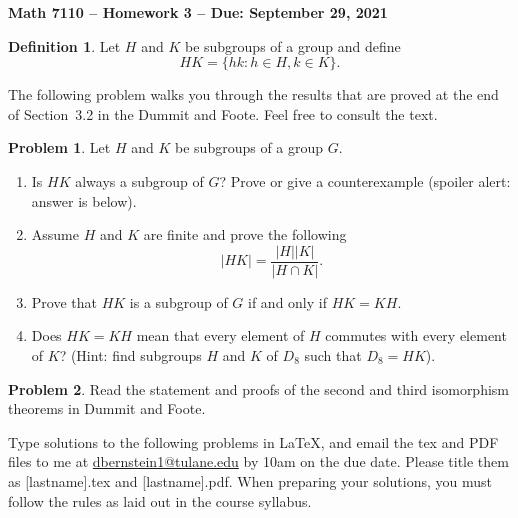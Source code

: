 \documentclass[letterpaper,11pt]{amsart}
\theoremstyle{plain}
\theoremstyle{definition}
\newtheorem*{defn*}{Definition}
\newtheorem{pr}{Problem}
\theoremstyle{remark}
\begin{document}
\Large

\begin{center}
{\bf Math 7110 -- Homework  3 --  Due:  September 29, 2021}
\end{center}

\normalsize


\medskip


\begin{defn*}
    Let $H$ and $K$ be subgroups of a group and define
    \[
        HK = \{hk: h \in H, k \in K\}.
    \]
\end{defn*}

The following problem walks you through the results that are proved at the end of Section~3.2 in the Dummit and Foote. Feel free to consult the text.

\begin{pr}
    Let $H$ and $K$ be subgroups of a group $G$.
    \begin{enumerate}
        \item Is $HK$ always a subgroup of $G$? Prove or give a counterexample (spoiler alert: answer is below).
        \item Assume $H$ and $K$ are finite and prove the following
        \[
            |HK| = \frac{|H||K|}{|H\cap K|}.
        \]
        \item Prove that $HK$ is a subgroup of $G$ if and only if $HK = KH$.
        \item Does $HK = KH$ mean that every element of $H$ commutes with every element of $K$? (Hint: find subgroups $H$ and $K$ of $D_8$ such that $D_8 = HK$).
    \end{enumerate}
\end{pr}

\begin{pr}
     Read the statement and proofs of the second and third isomorphism theorems in Dummit and Foote.
\end{pr}

\bigskip

Type solutions to the following problems in \LaTeX, and email the tex and PDF files to me at \url{dbernstein1@tulane.edu} by 10am on the due date.
Please title them as [lastname].tex and [lastname].pdf.
When preparing your solutions, you must follow the rules as laid out in the course syllabus.

\vspace{.5cm}

\end{document}
